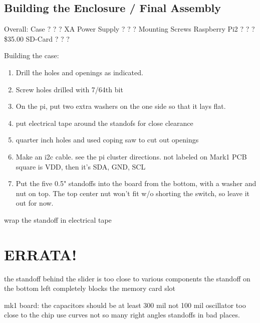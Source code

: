 \documentclass[11pt]{article}
\begin{document}
\subsection{Building the Enclosure / Final Assembly}

Overall:
	Case		?		?		?
	XA Power Supply	?		?		?
	Mounting Screws
	Raspberry Pi2	?		?		?	\$35.00
	SD-Card		?		?		?




Building the case:
\begin{enumerate}
\item	Drill the holes and openings as indicated.

\item	Screw holes drilled with 7/64th bit

\item	On the pi, put two extra washers on the one side so that it lays
	flat.

\item	put electrical tape around the standofs for close clearance
	
\item	quarter inch holes and used coping saw to cut out openings
\item	Make an i2c cable.  see the pi cluster directions.
	not labeled on Mark1 PCB
	square is VDD, then it's SDA, GND, SCL


	\item	Put the five 0.5" standoffs into the board from the bottom, with
		a washer and nut on top.  The top center nut won't fit w/o shorting
		the switch, so leave it out for now.

\end{enumerate}


	wrap the standoff in electrical tape

\section{ERRATA!}

the standoff behind the slider is too close to various components
the standoff on the bottom left completely blocks the memory card slot

mk1 board:
the capacitors should be at least 300 mil not 100 mil
oscillator too close to the chip
use curves not so many right angles
standoffs in bad places.
\end{document}
